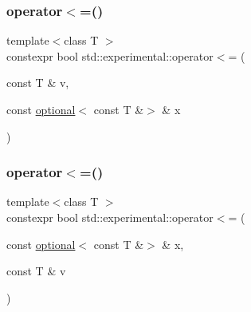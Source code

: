 \mbox{\label{namespacestd_1_1experimental_aca22cd45974dad371a24b9618f2d1b33}} 
\subsubsection{\texorpdfstring{operator$<$=()}{operator<=()}\hspace{0.1cm}{\footnotesize\ttfamily [8/9]}}
{\footnotesize\ttfamily template$<$class T $>$ \\
constexpr bool std\+::experimental\+::operator$<$= (\begin{DoxyParamCaption}\item[{const T \&}]{v,  }\item[{const \mbox{\hyperlink{classstd_1_1experimental_1_1optional}{optional}}$<$ const T \&$>$ \&}]{x }\end{DoxyParamCaption})}

\mbox{\label{namespacestd_1_1experimental_afb3a1b869e0a3eb4840f37edf61ba0ef}} 
\subsubsection{\texorpdfstring{operator$<$=()}{operator<=()}\hspace{0.1cm}{\footnotesize\ttfamily [9/9]}}
{\footnotesize\ttfamily template$<$class T $>$ \\
constexpr bool std\+::experimental\+::operator$<$= (\begin{DoxyParamCaption}\item[{const \mbox{\hyperlink{classstd_1_1experimental_1_1optional}{optional}}$<$ const T \&$>$ \&}]{x,  }\item[{const T \&}]{v }\end{DoxyParamCaption})}

\mbox{\label{namespacestd_1_1experimental_a0bd6ca198e90eb70255e0b370072f154}} 
